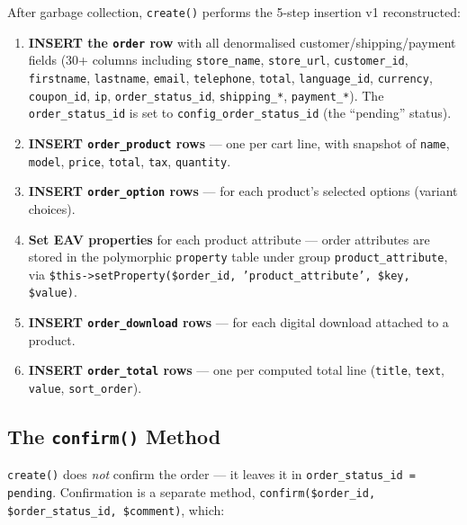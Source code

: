 \documentclass[11pt,a4paper]{article}
\begin{document}
After garbage collection, \texttt{create()} performs the 5-step
insertion v1 reconstructed:

\begin{enumerate}[leftmargin=1.6em,itemsep=2pt]
  \item \textbf{INSERT the \texttt{order} row} with all denormalised
        customer/shipping/payment fields (30+ columns including
        \texttt{store\_name}, \texttt{store\_url},
        \texttt{customer\_id}, \texttt{firstname}, \texttt{lastname},
        \texttt{email}, \texttt{telephone}, \texttt{total},
        \texttt{language\_id}, \texttt{currency}, \texttt{coupon\_id},
        \texttt{ip}, \texttt{order\_status\_id},
        \texttt{shipping\_*}, \texttt{payment\_*}). The
        \texttt{order\_status\_id} is set to
        \texttt{config\_order\_status\_id} (the ``pending'' status).
  \item \textbf{INSERT \texttt{order\_product} rows} --- one per
        cart line, with snapshot of \texttt{name}, \texttt{model},
        \texttt{price}, \texttt{total}, \texttt{tax},
        \texttt{quantity}.
  \item \textbf{INSERT \texttt{order\_option} rows} --- for each
        product's selected options (variant choices).
  \item \textbf{Set EAV properties} for each product attribute ---
        order attributes are stored in the polymorphic
        \texttt{property} table under group
        \texttt{product\_attribute}, via \texttt{\$this->setProperty(\$order\_id,
        'product\_attribute', \$key, \$value)}.
  \item \textbf{INSERT \texttt{order\_download} rows} --- for each
        digital download attached to a product.
  \item \textbf{INSERT \texttt{order\_total} rows} --- one per
        computed total line (\texttt{title}, \texttt{text},
        \texttt{value}, \texttt{sort\_order}).
\end{enumerate}

\subsection{The \texttt{confirm()} Method}

\texttt{create()} does \emph{not} confirm the order --- it leaves it
in \texttt{order\_status\_id = pending}. Confirmation is a separate
method, \texttt{confirm(\$order\_id, \$order\_status\_id,
\$comment)}, which:
\end{document}
